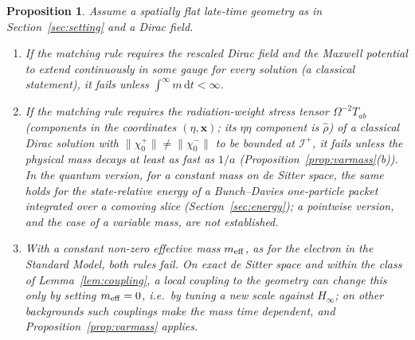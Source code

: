 \documentclass[11pt,a4paper]{article}
\newtheorem{proposition}{Proposition}
\theoremstyle{definition}
\newcommand{\scri}{\mathscr{I}^{+}}
\newcommand{\dd}{\mathrm{d}}
\begin{document}
\begin{proposition}
\label{prop:ccc}
Assume a spatially flat late-time geometry as in Section~\ref{sec:setting} and a Dirac field.
\begin{enumerate}[label=(\alph*)]
\item If the matching rule requires the rescaled Dirac field and the Maxwell potential to extend continuously in some gauge for every solution (a classical statement), it fails unless $\int^{\infty}m\,\dd t<\infty$.
\item If the matching rule requires the radiation-weight stress tensor $\Omega^{-2}T_{ab}$ (components in the coordinates $(\eta,\mathbf{x})$; its $\eta\eta$ component is $\hat\rho$) of a classical Dirac solution with $\|\chi_{0}^{+}\|\neq\|\chi_{0}^{-}\|$ to be bounded at $\scri$, it fails unless the physical mass decays at least as fast as $1/a$ (Proposition~\ref{prop:varmass}(b)). In the quantum version, for a constant mass on de Sitter space, the same holds for the state-relative energy of a Bunch--Davies one-particle packet integrated over a comoving slice (Section~\ref{sec:energy}); a pointwise version, and the case of a variable mass, are not established.
\item With a constant non-zero effective mass $m_{\rm eff}$, as for the electron in the Standard Model, both rules fail. On exact de Sitter space and within the class of Lemma~\ref{lem:coupling}, a local coupling to the geometry can change this only by setting $m_{\rm eff}=0$, i.e.\ by tuning a new scale against $H_{\infty}$; on other backgrounds such couplings make the mass time dependent, and Proposition~\ref{prop:varmass} applies.
\end{enumerate}
\end{proposition}
\end{document}
